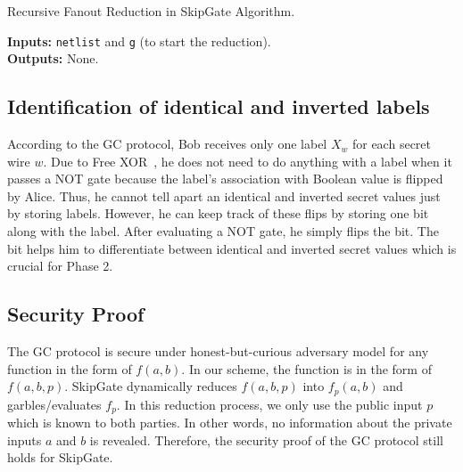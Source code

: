 \begin{algorithm}[ht]
\caption{Recursive Fanout Reduction in SkipGate Algorithm.}
\textbf{Inputs:} \texttt{netlist} and \texttt{g} (to start the reduction).\\
\textbf{Outputs:} None.\\
\label{skipgate_reduction}
\begin{algorithmic}[1]

\ENDIF
{}
	\ENDIF
	\ENDIF
\ENDIF
\end{algorithmic}
\end{algorithm}

\subsection{Identification of identical and inverted labels} According to the GC protocol, Bob receives only one label $X_w$ for each secret wire $w$.
Due to Free XOR~\cite{kolesnikov2008improved}, he does not need to do anything with a label when it passes a NOT gate because the label's association with Boolean value is flipped by Alice.
Thus, he cannot tell apart an identical and inverted secret values just by storing labels.
However, he can keep track of these flips by storing one bit along with the label.
After evaluating a NOT gate, he simply flips the bit.
The bit helps him to differentiate between identical and inverted secret values which is crucial for Phase 2.

\subsection{Security Proof} The GC protocol is secure under honest-but-curious adversary model for any function in the form of $f(a,b)$.
In our scheme, the function is in the form of $f(a,b,p)$.
SkipGate dynamically reduces $f(a,b,p)$ into $f_p(a,b)$ and garbles/evaluates $f_p$.
In this reduction process, we only use the public input $p$ which is known to both parties.
In other words, no information about the private inputs $a$ and $b$ is revealed.
Therefore, the security proof of the GC protocol still holds for SkipGate.
